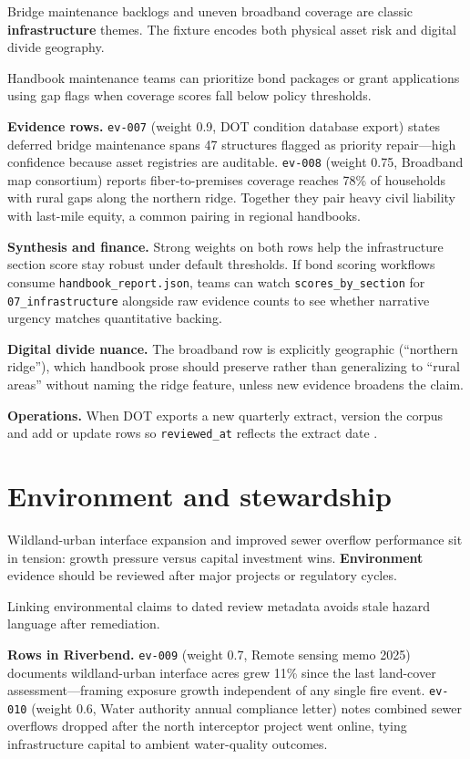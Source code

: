 \documentclass[
]{article}
\begin{document}
Bridge maintenance backlogs and uneven broadband coverage are classic
\textbf{infrastructure} themes. The fixture encodes both physical asset
risk and digital divide geography.

Handbook maintenance teams can prioritize bond packages or grant
applications using gap flags when coverage scores fall below policy
thresholds.

\textbf{Evidence rows.} \texttt{ev-007} (weight 0.9, DOT condition
database export) states deferred bridge maintenance spans 47 structures
flagged as priority repair---high confidence because asset registries
are auditable. \texttt{ev-008} (weight 0.75, Broadband map consortium)
reports fiber-to-premises coverage reaches 78\% of households with rural
gaps along the northern ridge. Together they pair heavy civil liability
with last-mile equity, a common pairing in regional handbooks.

\textbf{Synthesis and finance.} Strong weights on both rows help the
infrastructure section score stay robust under default thresholds. If
bond scoring workflows consume \texttt{handbook\_report.json}, teams can
watch \texttt{scores\_by\_section} for \texttt{07\_infrastructure}
alongside raw evidence counts to see whether narrative urgency matches
quantitative backing.

\textbf{Digital divide nuance.} The broadband row is explicitly
geographic (``northern ridge''), which handbook prose should preserve
rather than generalizing to ``rural areas'' without naming the ridge
feature, unless new evidence broadens the claim.

\textbf{Operations.} When DOT exports a new quarterly extract, version
the corpus and add or update rows so \texttt{reviewed\_at} reflects the
extract date \citep{template2026}.

\newpage

\section{Environment and stewardship}\label{environment-and-stewardship}

Wildland-urban interface expansion and improved sewer overflow
performance sit in tension: growth pressure versus capital investment
wins. \textbf{Environment} evidence should be reviewed after major
projects or regulatory cycles.

Linking environmental claims to dated review metadata avoids stale
hazard language after remediation.

\textbf{Rows in Riverbend.} \texttt{ev-009} (weight 0.7, Remote sensing
memo 2025) documents wildland-urban interface acres grew 11\% since the
last land-cover assessment---framing exposure growth independent of any
single fire event. \texttt{ev-010} (weight 0.6, Water authority annual
compliance letter) notes combined sewer overflows dropped after the
north interceptor project went online, tying infrastructure capital to
ambient water-quality outcomes.
\end{document}
